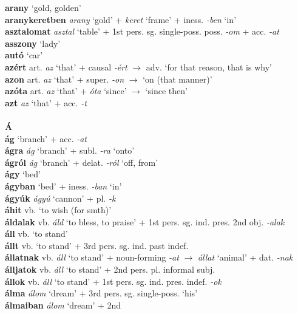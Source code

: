 \documentclass[11pt]{article}
\begin{document}
\textbf{arany} `gold, golden' \\
\textbf{aranykeretben} \emph{arany} `gold' + \emph{keret} `frame' +
iness. \emph{-ben} `in' \\
\textbf{asztalomat} \emph{asztal} `table' + 1st
pers. sg. single\hyp{}poss. poss. \emph{-om} + acc. \emph{-at} \\
\textbf{asszony} `lady' \\
\textbf{autó} `car' \\
\textbf{azért} art. \emph{az} `that' + causal \emph{-ért}
$\rightarrow$ adv. `for that reason, that is why' \\
\textbf{azon} art. \emph{az} `that' + super. \emph{-on}
$\rightarrow$ `on (that manner)' \\
\textbf{azóta} art. \emph{az} `that' + \emph{óta} `since'
$\rightarrow$ `since then' \\
\textbf{azt} \emph{az} `that' + acc. \emph{-t} \\
\ \\
\noindent \textbf{\large Á} \\
\textbf{ág} `branch' + acc. \emph{-at} \\
\textbf{ágra} \emph{ág} `branch' + subl. \emph{-ra}
`onto' \\
\textbf{ágról} \emph{ág} `branch' + delat. \emph{-ról} `off, from' \\
\textbf{ágy} `bed' \\
\textbf{ágyban} `bed' + iness. \emph{-ban} `in' \\
\textbf{ágyúk} \emph{ágyú} `cannon' + pl. \emph{-k} \\
\textbf{áhit} vb. `to wish (for smth)' \\
\textbf{áldalak} vb. \emph{áld} `to bless, to praise' + 1st
pers. sg. ind. pres. 2nd obj. \emph{-alak} \\
\textbf{áll} vb. `to stand' \\
\textbf{állt} vb. `to stand' + 3rd pers. sg. ind. past indef. \\
\textbf{állatnak} vb. \emph{áll} `to stand' +
noun\hyp{}forming \emph{-at} $\rightarrow$ \emph{állat} `animal' +
dat. \emph{-nak} \\
\textbf{álljatok} vb. \emph{áll} `to stand' + 2nd pers. pl. informal
subj. \\
\textbf{állok} vb. \emph{áll} `to stand' + 1st
pers. sg. ind. pres. indef. \emph{-ok} \\
\textbf{álma} \emph{álom} `dream' + 3rd
pers. sg. single\hyp{}poss. `his' \\
\textbf{álmaiban} \emph{álom} `dream' + 2nd
\end{document}

